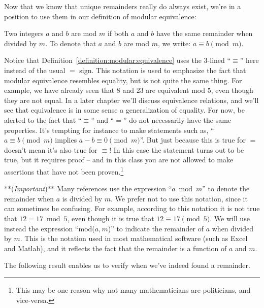 Now that we know that unique remainders really do always exist, we're in a position to use them in our definition of modular equivalence: 

\begin{defn}\label{definition:modular:equivalence}
 Two integers $a$ and $b$ are  mod $m$  if both $a$ and $b$ have the same remainder when divided by $m$. To denote that $a$ and $b$ are  mod $m$, we write: $a \equiv b \pmod{m}$.
 \end{defn}

\begin{rem}
Notice that Definition~\ref{definition:modular:equivalence} uses the 3-lined ``$\equiv$'' here instead of the usual $=$ sign. This notation is used  to emphasize the fact that modular equivalence resembles equality, but is not quite the same thing.  For example, we have already seen that 8 and 23 are equivalent mod 5, even though they are not equal.  In a later chapter we'll discuss equivalence relations, and we'll see that equivalence is in some sense a generalization of equality. For now,  be alerted to the fact that ``$\equiv$'' and ``$=$'' do not necessarily have the same properties. It's tempting for instance to make statements such as, ``$a \equiv b \pmod{m}$ implies $a-b \equiv 0 \pmod{m}$''. But just because this is true for $=$ doesn't mean it's also true for $\equiv$!  In this case the statement turns out to be true, but it requires proof -- and in this class you are not allowed to make assertions that have not been proven.\footnote{This may be one reason why not many mathematicians are politicians, and vice-versa.}  
\end{rem}

\begin{rem}
**(\emph{Important})** Many references use the expression ``$a \bmod m$'' to denote the remainder when $a$ is divided by $m$.  We prefer not to use this notation, since it can sometimes be confusing.  For example, according to this notation it is not true that $12 = 17 \bmod 5$, even though it is true that $12 \equiv 17 \pmod{5}$.   We will use instead the expression ``mod($a,m$)'' to indicate the remainder of $a$ when divided by $m$.  This is the notation used in most mathematical software (such as Excel and Matlab), and it reflects the fact that the remainder is a function of $a$ and $m$. 
\end{rem}

The following result enables us to verify when we've indeed found a remainder.

